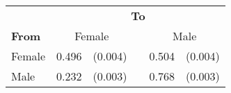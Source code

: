 
\begin{tabular}{lr@{ }r@{}cr@{ }r}
    \toprule
    & \multicolumn{5}{c}{\textbf{To}} \\
    \cmidrule(l){2-6}
    \textbf{From} & \multicolumn{2}{c}{Female} && \multicolumn{2}{c}{Male} \\
    \midrule
    Female & 0.496 & (0.004) &  & 0.504 & (0.004) \\
    Male & 0.232 & (0.003) &  & 0.768 & (0.003) \\
    \bottomrule
\end{tabular}
